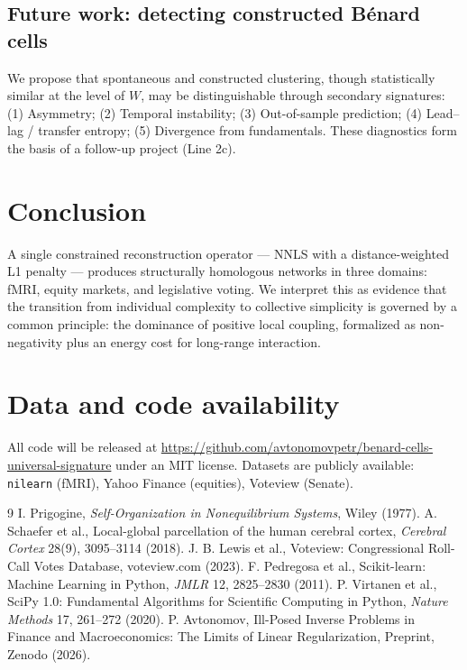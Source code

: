 \documentclass[11pt,a4paper]{article}
\begin{document}
\subsection{Future work: detecting constructed Bénard cells}
We propose that spontaneous and constructed clustering, though statistically similar at the level of $W$, may be distinguishable through secondary signatures: (1) Asymmetry; (2) Temporal instability; (3) Out-of-sample prediction; (4) Lead--lag / transfer entropy; (5) Divergence from fundamentals. These diagnostics form the basis of a follow-up project (Line 2c).

\section{Conclusion}
A single constrained reconstruction operator --- NNLS with a distance-weighted L1 penalty --- produces structurally homologous networks in three domains: fMRI, equity markets, and legislative voting. We interpret this as evidence that the transition from individual complexity to collective simplicity is governed by a common principle: the dominance of positive local coupling, formalized as non-negativity plus an energy cost for long-range interaction.

\section*{Data and code availability}
All code will be released at \url{https://github.com/avtonomovpetr/benard-cells-universal-signature} under an MIT license. Datasets are publicly available: \texttt{nilearn} (fMRI), Yahoo Finance (equities), Voteview (Senate).

\begin{thebibliography}{9}
 I. Prigogine, \textit{Self-Organization in Nonequilibrium Systems}, Wiley (1977).
 A. Schaefer et al., Local-global parcellation of the human cerebral cortex, \textit{Cerebral Cortex} 28(9), 3095--3114 (2018).
 J. B. Lewis et al., Voteview: Congressional Roll-Call Votes Database, voteview.com (2023).
 F. Pedregosa et al., Scikit-learn: Machine Learning in Python, \textit{JMLR} 12, 2825--2830 (2011).
 P. Virtanen et al., SciPy 1.0: Fundamental Algorithms for Scientific Computing in Python, \textit{Nature Methods} 17, 261--272 (2020).
 P. Avtonomov, Ill-Posed Inverse Problems in Finance and Macroeconomics: The Limits of Linear Regularization, Preprint, Zenodo (2026).
\end{thebibliography}
\end{document}
